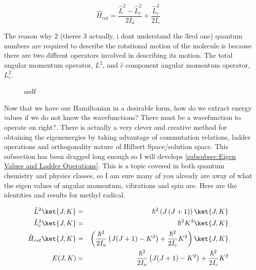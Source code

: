 \documentclass[11pt,a4paper]{book}
\newcommand{\imginput}[1]{} %
\begin{document}
			\begin{equation}
				\label{eq:rotational Hamiltonian for methyl radical}
				\hat{H}_{rot}  =  \dfrac{\hat{L}^2 - \hat{L}^2_c}{2I_a} + \dfrac{\hat{L}_c^2}{2I_c}
			\end{equation}				
			
			The reason why 2 (theres 3 actually, i dont understand the 3rrd one) quantum numbers are required to describe the rotational motion of the molecule is because there are two diffrent operators involved in describing its motion. The total angular momentum operator, $L^2$, and $\hat{c}$ component angular momentum operator, $L^2_c$.
			
			\begin{figure} [!ht]
				\centering
				\large
				\def\svgwidth{\columnwidth}
				\resizebox{12cm}{!}{\imginput{images/Methyl-Radical-Energy-Level-Distribution.pdf_tex}}
				\caption{asdf}
				\label{fig:Methyl-Radical-Energy-Level-Distribution}
			\end{figure}
			
			Now that we have our Hamiltonian in a desirable form, how do we extract energy values if we do not know the wavefunctions? There must be a wavefunction to operate on right?. There is actually a very clever and creative method for obtaining the eigenenergies by taking advantage of commutation relations, ladder operations and orthogonality nature of Hilbert Space/solution space. This subsection has been dragged long enough so I will develops \autoref{subsubsec:Eigen Values and Ladder Operations}. This is a topic covered in both quantum chemistry and physics classes, so I am sure many of you already are away of what the eigen values of angular momentum, vibrations and spin are. Here are the identities and results for methyl radical.
			
			\begin{eqnarray}
				\label{eq:total angular momentum eigen value}
				\hat{L}^2\ket{J,K}&=& \hbar^2\left(J\left(J+1\right)\right)\ket{J,K}\\
				\label{eq:component angular momentum eigen value}
				\hat{L}^2_c\ket{J,K} &=&\hbar^2K^2\ket{J,K} \\
				\label{eq:rotational eigen energy level of methyl radical}
				\hat{H}_{rot}\ket{J,K}  &=&\left( \dfrac{\hbar^2}{2I_a} \left( J(J+1) - K^2\right)  + \dfrac{\hbar^2}{2I_c} K^2\right)\ket{J,K} \\
				\label{eq:eigen energy level of methyl radical}
				E(J,K) &=& \dfrac{\hbar^2}{2I_a} \left( J(J+1) - K^2\right)  + \dfrac{\hbar^2}{2I_c} K^2
			\end{eqnarray}
	
\end{document}
